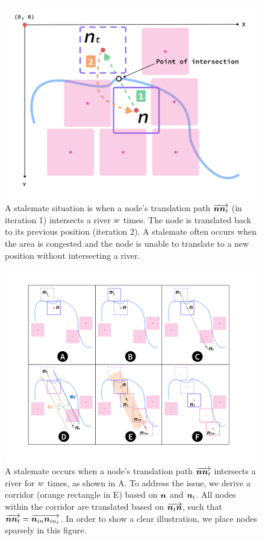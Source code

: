     {
        \begin{figure}[tb!]
            \centering
            \includegraphics[width=\columnwidth,keepaspectratio]{figure/stalemate.png}
            \caption{A stalemate situation is when a node's translation path $ \protect\overrightarrow{\bm{n}\bm{n}_t} $ (in iteration 1) intersects a river $ w $ times. The node is translated back to its previous position (iteration 2). A stalemate often occurs when the area is congested and the node is unable to translate to a new position without intersecting a river.}
            \label{fig:stalemate}
        \end{figure}
    }

    {
        \begin{figure}[tb!]
            \centering
            \includegraphics[width=\columnwidth,keepaspectratio]{figure/corridor.png}
            \caption{A stalemate occurs when a node's translation path $ \protect\overrightarrow{\bm{n}\bm{n}_t} $ intersects a river for $ w $ times, as shown in A. To address the issue, we derive a corridor (orange rectangle in E) based on $ \bm{n} $ and $ \bm{n}_t $. All nodes within the corridor are translated based on $ \protect\overrightarrow{\bm{n}_t\bm{n}} $, such that $ \protect\overrightarrow{\bm{n}\bm{n}_{t}} = \protect\overrightarrow{\bm{n}_{in}\bm{n}_{in_t}} $. In order to show a clear illustration, we place nodes sparsely in this figure.}
            \label{fig:corridor}
        \end{figure}
    }

